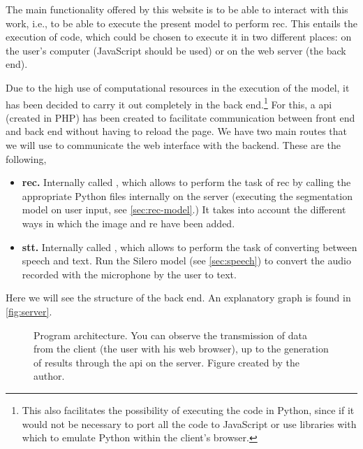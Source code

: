 The main functionality offered by this website is to be able to interact with
this work, i.e., to be able to execute the present model to perform
\gls{rec}. This entails the execution of code, which could be chosen to execute
it in two different places: on the user's computer (JavaScript should be used)
or on the web server (the back end).

Due to the high use of computational resources in the execution of the model,
it has been decided to carry it out completely in the back end.\footnote{This
  also facilitates the possibility of executing the code in Python, since if it
  would not be necessary to port all the code to JavaScript or use libraries
  with which to emulate Python within the client's browser.} For this, a
\gls{api} (created in PHP) has been created to facilitate communication between
front end and back end without having to reload the page. We have two main
routes that we will use to communicate the web interface with the
backend. These are the following,
\begin{itemize}
  \item \textbf{\gls{rec}.} Internally called , which
  allows to perform the task of \gls{rec} by calling the appropriate Python
  files internally on the server (executing the segmentation model on user
  input, see \vref{sec:rec-model}.) It takes into account the different ways in
  which the image and \gls{re} have been added.
  \item \textbf{\gls{stt}.} Internally called , which allows
  to perform the task of converting between speech and text. Run the Silero
  model (see \vref{sec:speech}) to convert the audio recorded with the
  microphone by the user to text.
\end{itemize}

Here we will see the structure of the back end. An explanatory graph is found
in \vref{fig:server}.

\begin{figure}[p]
  \centering
  \resizebox{\textwidth}{!}{}
  \caption[Program architecture]{Program architecture. You can observe the
    transmission of data from the client (the user with his web browser), up to
    the generation of results through the \gls{api} on the server. Figure
    created by the author.}%
  \label{fig:server}
\end{figure}
